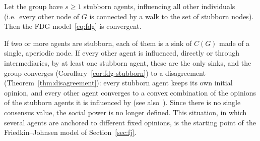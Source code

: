 \begin{corollary}
\label{cor:fdg-stubborn}
Let the group have $s \geq 1$ stubborn agents, influencing all other individuals
(i.e.\ every other node of $G$ is connected by a walk to the set of stubborn nodes).
Then the FDG model~\eqref{eq:fdg} is convergent.
\end{corollary}

\begin{remark}
\label{rem:many-stubborn}
If two or more agents are stubborn, each of them is a sink of $C(G)$ made of a single,
aperiodic node. If every other agent is influenced, directly or through
intermediaries, by at least one stubborn agent, these are the only sinks, and the group
converges (Corollary~\ref{cor:fdg-stubborn}) to a disagreement
(Theorem~\ref{thm:disagreement}): every stubborn agent keeps its own initial opinion, and
every other
agent converges to a convex combination of the opinions of the stubborn agents it is
influenced by (see also~\cite{proskurnikov2017tutorial}). Since there is no single
consensus value, the social power is no longer defined. This situation, in which
several agents are anchored to different fixed opinions, is the starting point of the
Friedkin--Johnsen model of Section~\ref{sec:fj}.
\end{remark}

